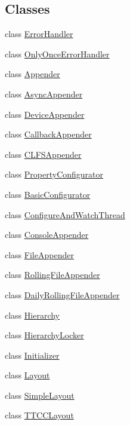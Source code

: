 \subsection*{Classes}
\begin{DoxyCompactItemize}
\item 
class \hyperlink{classlog4cplus_1_1ErrorHandler}{Error\-Handler}
\item 
class \hyperlink{classlog4cplus_1_1OnlyOnceErrorHandler}{Only\-Once\-Error\-Handler}
\item 
class \hyperlink{classlog4cplus_1_1Appender}{Appender}
\item 
class \hyperlink{classlog4cplus_1_1AsyncAppender}{Async\-Appender}
\item 
class \hyperlink{classlog4cplus_1_1DeviceAppender}{Device\-Appender}
\item 
class \hyperlink{classlog4cplus_1_1CallbackAppender}{Callback\-Appender}
\item 
class \hyperlink{classlog4cplus_1_1CLFSAppender}{C\-L\-F\-S\-Appender}
\item 
class \hyperlink{classlog4cplus_1_1PropertyConfigurator}{Property\-Configurator}
\item 
class \hyperlink{classlog4cplus_1_1BasicConfigurator}{Basic\-Configurator}
\item 
class \hyperlink{classlog4cplus_1_1ConfigureAndWatchThread}{Configure\-And\-Watch\-Thread}
\item 
class \hyperlink{classlog4cplus_1_1ConsoleAppender}{Console\-Appender}
\item 
class \hyperlink{classlog4cplus_1_1FileAppender}{File\-Appender}
\item 
class \hyperlink{classlog4cplus_1_1RollingFileAppender}{Rolling\-File\-Appender}
\item 
class \hyperlink{classlog4cplus_1_1DailyRollingFileAppender}{Daily\-Rolling\-File\-Appender}
\item 
class \hyperlink{classlog4cplus_1_1Hierarchy}{Hierarchy}
\item 
class \hyperlink{classlog4cplus_1_1HierarchyLocker}{Hierarchy\-Locker}
\item 
class \hyperlink{classlog4cplus_1_1Initializer}{Initializer}
\item 
class \hyperlink{classlog4cplus_1_1Layout}{Layout}
\item 
class \hyperlink{classlog4cplus_1_1SimpleLayout}{Simple\-Layout}
\item 
class \hyperlink{classlog4cplus_1_1TTCCLayout}{T\-T\-C\-C\-Layout}

\end{DoxyCompactItemize}
